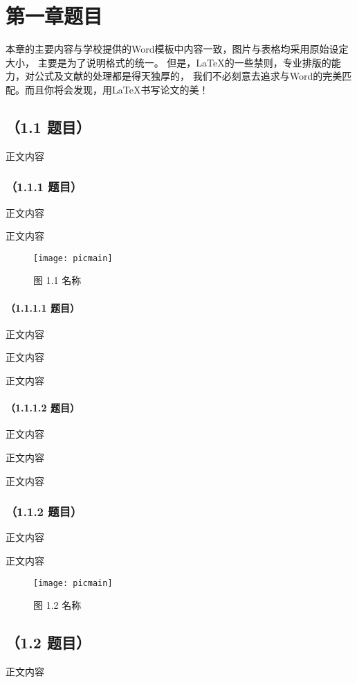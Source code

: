 \chapter{第一章题目}

本章的主要内容与学校提供的Word模板中内容一致，图片与表格均采用原始设定大小，%
主要是为了说明格式的统一。%
但是，\LaTeX{}的一些禁则，专业排版的能力，对公式及文献的处理都是得天独厚的，%
我们不必刻意去追求与Word的完美匹配。而且你将会发现，用\LaTeX{}书写论文的美！ %

\section{（1.1 题目）}
正文内容

\subsection{（1.1.1 题目）}
正文内容

正文内容

\begin{figure}[htp]
	\centering
	\texttt{[image: picmain]}
	\caption{图 1.1 名称}
\end{figure}

\subsubsection{（1.1.1.1 题目）}
正文内容

正文内容

正文内容

\subsubsection{（1.1.1.2 题目）}
正文内容

正文内容

正文内容

\subsection{（1.1.2 题目）}
正文内容

正文内容

\begin{figure}[htp]
	\centering
	\texttt{[image: picmain]}
	\caption{图 1.2 名称}
\end{figure}

\section{（1.2 题目）}
正文内容


